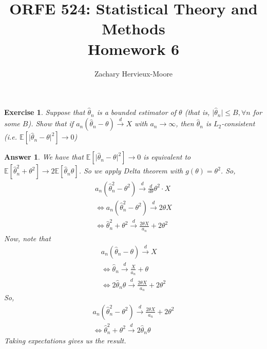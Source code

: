\documentclass[12pt]{article}
\title{ORFE 524: Statistical Theory and Methods \\ Homework 6}
\author{Zachary Hervieux-Moore}
\date{\displaydate{date}}
\theoremstyle{colon}
\newtheorem{exercise}{Exercise}
\newtheorem*{answer}{Answer}
\begin{document}
\maketitle

\clearpage

\begin{exercise}
  Suppose that $\widehat{\theta}_n$ is a bounded estimator of $\theta$ (that is, $\lvert \widehat{\theta}_n \rvert \leq B, \forall n$ for some $B$). Show that if $a_n(\widehat{\theta}_n - \theta) \xrightarrow{d} X$ with $a_n \rightarrow \infty$, then $\widehat{\theta}_n$ is $L_2$-consistent (i.e. $\mathbb{E}[\lvert \widehat{\theta}_n - \theta \rvert^2] \rightarrow 0$)
\end{exercise}

\begin{answer}
  We have that $\mathbb{E}[\lvert \widehat{\theta}_n - \theta \rvert^2] \rightarrow 0$ is equivalent to $\mathbb{E}[\widehat{\theta}_n^2 + \theta^2] \rightarrow 2 \mathbb{E}[\widehat{\theta}_n \theta]$. So we apply Delta theorem with $g(\theta) = \theta^2$. So,
  \begin{gather*}
    a_n(\widehat{\theta}_n^2 - \theta^2) \xrightarrow{d} \frac{d}{d \theta} \theta^2 \cdot X \\
    \Longleftrightarrow a_n(\widehat{\theta}_n^2 - \theta^2) \xrightarrow{d} 2 \theta X \\
    \Longleftrightarrow \widehat{\theta}_n^2 + \theta^2 \xrightarrow{d} \frac{2 \theta X}{a_n} + 2 \theta^2
  \end{gather*}
  Now, note that
  \begin{gather*}
    a_n(\widehat{\theta}_n - \theta) \xrightarrow{d} X \\
    \Longleftrightarrow \widehat{\theta}_n \xrightarrow{d} \frac{X}{a_n} + \theta \\
    \Longleftrightarrow 2\widehat{\theta}_n \theta \xrightarrow{d} \frac{2 \theta X}{a_n} + 2 \theta^2
  \end{gather*}
  So,
  \begin{gather*}
    a_n(\widehat{\theta}_n^2 - \theta^2) \xrightarrow{d} \frac{2 \theta X}{a_n} + 2 \theta^2 \\
    \Longleftrightarrow \widehat{\theta}_n^2 + \theta^2 \xrightarrow{d} 2 \widehat{\theta}_n \theta
  \end{gather*}
  Taking expectations gives us the result.
\end{answer}

\clearpage
\end{document}
